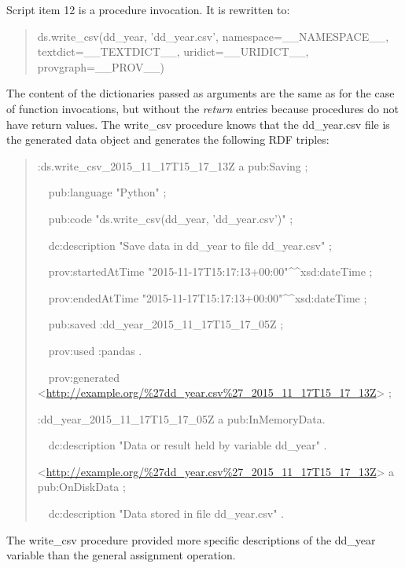 Script item 12 is a procedure invocation. It is rewritten to:
\begin{quotation}
	\noindent ds.write\_csv(dd\_year, 'dd\_year.csv', namespace=\_\_NAMESPACE\_\_, textdict=\_\_TEXTDICT\_\_, uridict=\_\_URIDICT\_\_, provgraph=\_\_PROV\_\_)
\end{quotation}
The content of the dictionaries passed as arguments are the same as for the case of function invocations, but without the \emph{return} entries because procedures do not have return values. The write\_csv procedure knows that the dd\_year.csv file is the generated data object and generates the following RDF triples:
\begin{quotation}
	\noindent:ds.write\_csv\_2015\_11\_17T15\_17\_13Z a pub:Saving ;
	
	\noindent\ \ pub:language "Python" ;
	
	\noindent\ \ pub:code "ds.write\_csv(dd\_year, 'dd\_year.csv')" ;
	
	\noindent\ \ dc:description "Save data in dd\_year to file dd\_year.csv" ;
	
	\noindent\ \ prov:startedAtTime "2015-11-17T15:17:13+00:00"\^{}\^{}xsd:dateTime ;
	
	\noindent\ \ prov:endedAtTime "2015-11-17T15:17:13+00:00"\^{}\^{}xsd:dateTime ;
	
	\noindent\ \ pub:saved :dd\_year\_2015\_11\_17T15\_17\_05Z ;

	\noindent\ \ prov:used :pandas .
	
	\noindent\ \ prov:generated <\url{http://example.org/%27dd_year.csv%27_2015_11_17T15_17_13Z}> ;
	
	\noindent:dd\_year\_2015\_11\_17T15\_17\_05Z a pub:InMemoryData.
	
	\noindent\ \ dc:description "Data or result held by variable dd\_year" .
	
	\noindent<\url{http://example.org/%27dd_year.csv%27_2015_11_17T15_17_13Z}> a pub:OnDiskData ;
	
	\noindent\ \ dc:description "Data stored in file dd\_year.csv" .
\end{quotation}
The write\_csv procedure provided more specific descriptions of the dd\_year variable than the general assignment operation.

